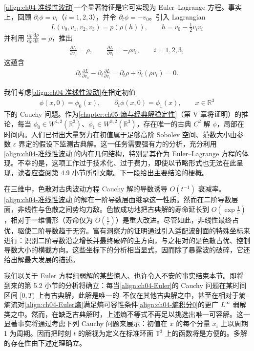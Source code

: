 ﻿\documentclass[../../main.tex]{subfiles}
\begin{document}
\eqref{align:ch04-准线性波动}一个显著特征是它可实现为 Euler--Lagrange 方程。事实上，回顾 $\partial_{i}\phi=v_{i}$（$i=1,2,3$），并令 $\partial_{t}\phi=-v_{0}$。引入 Lagrangian
\begin{align}
L(v_{0},v_{1},v_{2},v_{3})=p(\rho(h)),\qquad h=v_{0}-\tfrac{1}{2}v_{i}v_{i}
\label{align:ch04-Lagrangian}
\end{align}
并利用 $\frac{\mathrm{d}p}{\mathrm{d}\rho}\frac{\mathrm{d}\rho}{\mathrm{d}h}=\rho$，推出
\begin{align}
\frac{\partial L}{\partial v_{0}}=\rho,\qquad \frac{\partial L}{\partial v_{i}}=-\rho v_{i},\qquad i=1,2,3,
\label{align:ch04-L偏导}
\end{align}
这蕴含
\begin{align}
\partial_{t}\frac{\partial L}{\partial v_{0}}-\partial_{i}\frac{\partial L}{\partial v_{i}}=\partial_{t}\rho+\partial_{i}(\rho v_{i})=0.
\label{align:ch04-EulerLagrange}
\end{align}

我们考虑\eqref{align:ch04-准线性波动}在指定初值
\begin{align}
\phi(x,0)=\phi_{0}(x),\qquad \partial_{t}\phi(x,0)=\phi_{1}(x),\qquad x\in\mathbb{R}^{3}
\label{align:ch04-波动初值}
\end{align}
下的 Cauchy 问题。作为\cref{chapter:ch05-熵与经典解稳定性}（第 V 章将证明）的推论，每当 $\phi_{0}\in W^{4,2}(\mathbb{R}^{3})$、$\phi_{1}\in W^{3,2}(\mathbb{R}^{3})$，存在唯一的古典 $C^{2}$ 解 $\phi$，局部在时间内。人们已付出大量努力在初值属于足够高阶 Sobolev 空间、范数大小由参数 $\varepsilon$ 界定的假设下监测古典解。这一任务需要强有力的分析，充分利用\eqref{align:ch04-准线性波动}的内在几何结构，特别是其作为 Euler--Lagrange 方程的体现。不幸的是，这项工作过于技术化、过于费力，即使以节略形式也无法在此呈现，读者应查阅第 4.9 小节所引文献。下一段给出主要结论的梗概。


在三维中，色散对古典波动方程 Cauchy 解的导数诱导 $O(t^{-1})$ 衰减率。\eqref{align:ch04-准线性波动}的解在一阶导数层面继承这一性质。然而在二阶导数层面，非线性与色散之间势均力敌。色散成功地把古典解的寿命延长到 $O(\exp\frac{1}{\varepsilon})$，相对于一维情形（寿命仅为 $O(\frac{1}{\varepsilon})$）是重大改进。尽管如此，非线性最终占优，驱使二阶导数趋于无穷。富有洞察力的证明通过引入适配波剖面的特殊坐标来进行：识别二阶导数沿之增长并最终破碎的主方向，与之相对的是色散占优、控制导数大小的横截方向。这些坐标下的分析相当显式，因而除了暴露波的破碎，它还给出解最大发展的描述。

我们以关于 Euler 方程组弱解的某些惊人、也许令人不安的事实结束本节。即将到来的第 5.2 小节的分析将确立：每当\eqref{align:ch04-Euler}的 Cauchy 问题在某时间区间 $[0,T)$ 上有古典解，此解是唯一的--不仅在其他古典解之中，甚至在相对于熵--熵流对\eqref{align:ch04-Euler熵}满足熵可容性条件\eqref{align:ch04-熵积分0}的更广 $L^{\infty}$ 弱解类之中。然而，在缺乏古典解时，上述熵不等式不再足以挑选出唯一可容解。这一显著事实将通过考虑下列 Cauchy 问题来展示：初值在 $x$ 的每个分量 $x_{i}$ 上以周期 1 为周期。因而把时刻 $t$ 的解视为定义在标准环面 $\mathbb{T}^{3}$ 上的函数将是方便的。多解的存在性由下述定理确立。
\end{document}
